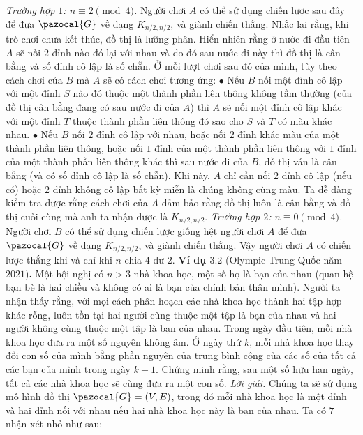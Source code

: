 \begin{multicols}{2}
	\vskip 0.1cm
	\textit{Trường hợp $1$: $n \equiv 2 \pmod 4$.} Người chơi $A$ có thể sử dụng chiến lược sau đây để đưa $\pazocal{G}$ về dạng $K_{n/2,n/2}$, và giành chiến thắng. Nhắc lại rằng, khi trò chơi chưa kết thúc, đồ thị là lưỡng phân. Hiển nhiên rằng ở nước đi đầu tiên $A$ sẽ nối $2$ đỉnh nào đó lại với nhau và do đó sau nước đi này thì đồ thị là cân bằng và số đỉnh cô lập là số chẵn. Ở mỗi lượt chơi sau đó của mình, tùy theo cách chơi của $B$ mà $A$ sẽ có cách chơi tương ứng:
	\vskip 0.1cm
	$\bullet$ Nếu $B$ nối một đỉnh cô lập với một đỉnh $S$ nào đó thuộc một thành phần liên thông không tầm thường (của đồ thị cân bằng đang có sau nước đi của $A$) thì $A$ sẽ nối một đỉnh cô lập khác với một đỉnh $T$ thuộc thành phần liên thông đó sao cho $S$ và $T$ có màu khác nhau.
	\vskip 0.1cm
	$\bullet$ Nếu $B$ nối $2$ đỉnh cô lập với nhau, hoặc nối $2$ đỉnh khác màu của một thành phần liên thông, hoặc nối $1$ đỉnh của một thành phần liên thông với $1$ đỉnh của một thành phần liên thông khác thì sau nước đi của $B$, đồ thị vẫn là cân bằng (và có số đỉnh cô lập là số chẵn). Khi này, $A$ chỉ cần nối $2$ đỉnh cô lập (nếu có) hoặc $2$ đỉnh không cô lập bất kỳ miễn là chúng không cùng màu.
	\vskip 0.1cm
	Ta dễ dàng kiểm tra được rằng cách chơi của $A$ đảm bảo rằng đồ thị luôn là cân bằng và đồ thị cuối cùng mà anh ta nhận được là $K_{n/2, n/2}$. 
	\vskip 0.1cm
	\textit{Trường hợp $2$: $n\equiv 0\pmod 4$.} Người chơi $B$ có thể sử dụng chiến lược giống hệt người chơi $A$ để đưa $\pazocal{G}$ về dạng  $K_{n/2,n/2}$, và giành chiến thắng.      
	\vskip 0.1cm
	Vậy người chơi $A$ có chiến lược  thắng khi và chỉ khi $n$ chia $4$ dư $2$.  
	\vskip 0.1cm
	\textbf{\color{hoccungpi}Ví dụ $\pmb{3.2}$} (Olympic Trung Quốc năm $2021$)\textbf{\color{hoccungpi}.}
	Một hội nghị có $n>3$ nhà khoa học, một số họ là bạn của nhau (quan hệ bạn bè là hai chiều và không có ai là bạn của chính bản thân mình). Người ta nhận thấy rằng, với mọi cách phân hoạch các nhà khoa học thành hai tập hợp khác rỗng, luôn tồn tại  hai người cùng thuộc một tập là bạn của nhau và hai người không cùng thuộc một tập là bạn của nhau.
	\vskip 0.1cm
	Trong ngày đầu tiên, mỗi nhà khoa học đưa ra một số nguyên không âm. Ở ngày thứ $k$, mỗi nhà khoa học thay đổi con số của mình bằng phần nguyên của trung bình cộng của các số của tất cả các bạn của mình trong ngày $k-1$. Chứng minh rằng, sau một số hữu hạn ngày, tất cả các nhà khoa học sẽ cùng đưa ra một con số.    
	\vskip 0.1cm
	\textit{Lời giải.}
	Chúng ta sẽ sử dụng mô hình đồ thị $\pazocal{G} = (V,E)$, trong đó mỗi nhà khoa học là một đỉnh và hai đỉnh nối với nhau nếu hai nhà khoa học này là bạn của nhau. Ta có $7$ nhận xét nhỏ như sau:

\end{multicols}
